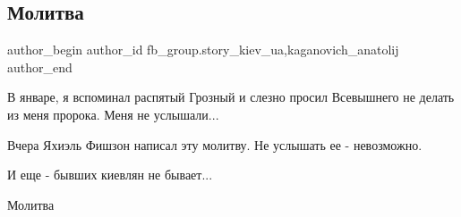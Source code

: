  
 
 
 
 
 
\subsection{Молитва}
\label{sec:01_03_2022.fb.fb_group.story_kiev_ua.1.molitva}
 
\ifcmt
 author_begin
   author_id fb_group.story_kiev_ua,kaganovich_anatolij
 author_end
\fi

В январе, я вспоминал распятый Грозный и слезно просил Всевышнего не делать из
меня пророка. Меня не услышали...

Вчера Яхиэль Фишзон написал эту молитву. Не услышать ее - невозможно.

И еще - бывших киевлян не бывает...

Молитва

